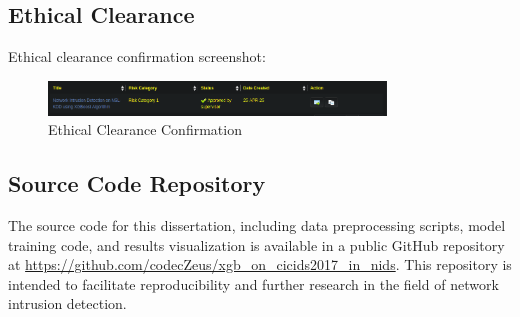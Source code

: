 \subsection{Ethical Clearance}
Ethical clearance confirmation screenshot:
\begin{figure}[H]
	\centering
	\includegraphics[width=0.8\textwidth]{assets/figures/ethics.png}
	\caption{Ethical Clearance Confirmation}
	\label{fig:ethical_clearance}
\end{figure}

\subsection{Source Code Repository}
The source code for this dissertation, including data preprocessing scripts, model training code, and results visualization
 is available in a public GitHub repository at \url{https://github.com/codecZeus/xgb_on_cicids2017_in_nids}. This repository is intended to 
 facilitate reproducibility and further research in the field of network intrusion detection.
